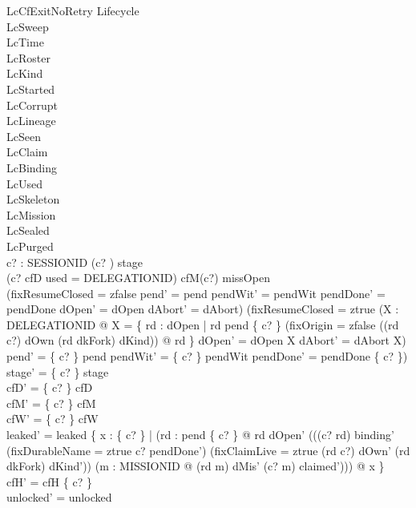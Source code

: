 \documentclass[a4paper,10pt,fleqn]{article}
\begin{document}
\begin{schema}{LcCfExitNoRetry}
\Delta Lifecycle \\
\Xi LcSweep \\
\Xi LcTime \\
\Xi LcRoster \\
\Xi LcKind \\
\Xi LcStarted \\
\Xi LcCorrupt \\
\Xi LcLineage \\
\Xi LcSeen \\
\Xi LcClaim \\
\Xi LcBinding \\
\Xi LcUsed \\
\Xi LcSkeleton \\
\Xi LcMission \\
\Xi LcSealed \\
\Xi LcPurged \\
c? : SESSIONID
\where
(c? ) \in stage \\
(c? \notin \dom cfD \land used = DELEGATIONID) \lor cfM(c?) \notin missOpen \\
(fixResumeClosed = zfalse \land pend' = pend \land pendWit' = pendWit \land pendDone' = pendDone \land dOpen' = dOpen \land dAbort' = dAbort) \lor (fixResumeClosed = ztrue \land (\exists X : \power DELEGATIONID @ X = \{ rd : dOpen | rd \in pend \limg \{ c? \} \rimg \land (fixOrigin = zfalse \lor ((rd \mapsto c?) \in dOwn \land (rd \mapsto dkFork) \in dKind)) @ rd \} \land dOpen' = dOpen \setminus X \land dAbort' = dAbort \cup X) \land pend' = \{ c? \} \ndres pend \land pendWit' = \{ c? \} \ndres pendWit \land pendDone' = pendDone \setminus \{ c? \}) \\
stage' = \{ c? \} \ndres stage \\
cfD' = \{ c? \} \ndres cfD \\
cfM' = \{ c? \} \ndres cfM \\
cfW' = \{ c? \} \ndres cfW \\
leaked' = leaked \cup \{ x : \{ c? \} | (\exists rd : pend \limg \{ c? \} \rimg @ rd \in dOpen' \land \lnot (((c? \mapsto rd) \in binding' \lor (fixDurableName = ztrue \land c? \in pendDone') \lor (fixClaimLive = ztrue \land (rd \mapsto c?) \in dOwn' \land (rd \mapsto dkFork) \in dKind')) \land (\exists m : MISSIONID @ (rd \mapsto m) \in dMis' \land (c? \mapsto m) \in claimed'))) @ x \} \\
cfH' = cfH \setminus \{ c? \} \\
unlocked' = unlocked \\

\end{schema}
\end{document}
